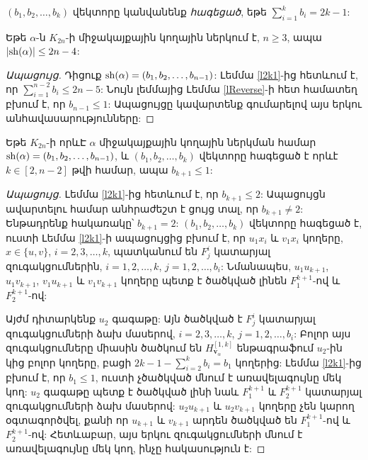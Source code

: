 $(b_1,b_2,\ldots,b_k)$ վեկտորը կանվանենք \textit{հագեցած}, եթե $\sum\limits_{i=1}^{k}{b_i} = 2k-1$:

\begin{corollary}
\label{c2n4}
Եթե $\alpha$-ն $K_{2n}$-ի միջակայքային կողային ներկում է, $n\geq 3$, ապա  
$|{\rm sh}(\alpha)| \leq 2n-4$:
\end{corollary}

\begin{proof}[Ապացույց]
Դիցուք ${\rm sh}(\alpha) = (b_1,b_2,\ldots, b_{n-1})$: Լեմմա \ref{l2k1}-ից հետևում է, որ $\sum\limits_{i=1}^{n-2}{b_i} \leq 2n-5$: Նույն լեմմայից Լեմմա \ref{lReverse}-ի հետ համատեղ բխում է, որ $b_{n-1} \leq 1$: Ապացույցը կավարտենք գումարելով այս երկու անհավասարությունները:
\end{proof}

\begin{lemma}
\label{lAfterSaturated}
Եթե $K_{2n}$-ի որևԷ $\alpha$ միջակայքային կողային ներկման համար ${\rm sh}(\alpha) = (b_1,b_2,\ldots, b_{n-1})$, և $(b_1,b_2,\ldots,b_k)$ վեկտորը հագեցած է որևէ $k \in [2,n-2]$ թվի համար, ապա $b_{k+1} \leq 1$:
\end{lemma}

\begin{proof}[Ապացույց]
Լեմմա \ref{l2k1}-ից հետևում է, որ $b_{k+1} \leq 2$: Ապացույցն ավարտելու համար անհրաժեշտ է ցույց տալ, որ $b_{k+1} \neq 2$: Ենթադրենք հակառակը՝ $b_{k+1} = 2$: $(b_1,b_2,\ldots,b_k)$ վեկտորը հագեցած է, ուստի Լեմմա \ref{l2k1}-ի ապացույցից բխում է, որ $u_1x_i$ և $v_1x_i$ կողերը, $x \in \{u,v\}$, $i=2,3,\ldots,k$, պատկանում են $F^i_j$ կատարյալ զուգակցումներին, $i=1,2,\ldots,k$, $j=1,2,\ldots,b_i$: Նմանապես, $u_1u_{k+1}$, $u_1v_{k+1}$, $v_1u_{k+1}$ և $v_1v_{k+1}$ կողերը պետք է ծածկված լինեն $F^{k+1}_1$-ով և $F^{k+1}_2$-ով:

Այժմ դիտարկենք $u_2$ գագաթը: Այն ծածկված է $F^i_j$ կատարյալ զուգակցումների ձախ մասերով, $i=2,3,\ldots,k$, $j=1,2,\ldots,b_i$: Բոլոր այս զուգակցումները միասին ծածկում են $H_{\mathbf{v}_\alpha}^{[1,k]}$ ենթագրաֆում $u_2$-ին կից բոլոր կողերը, բացի $2k-1 - \sum\limits_{i=2}^{k}{b_i} = b_1$ կողերից: Լեմմա \ref{l2k1}-ից բխում է, որ $b_1 \leq 1$, ուստի չծածկված մնում է առավելագույնը մեկ կող: $u_2$ գագաթը պետք է ծածկված լինի նաև $F^{k+1}_1$ և $F^{k+1}_2$ կատարյալ զուգակցումների ձախ մասերով: $u_2u_{k+1}$ և $u_2v_{k+1}$ կողերը չեն կարող օգտագործվել, քանի որ $u_{k+1}$ և $v_{k+1}$ արդեն ծածկված են $F^{k+1}_1$-ով և $F^{k+1}_2$-ով: Հետևաբար, այս երկու զուգակցումների մնում է առավելագույնը մեկ կող, ինչը հակասություն է:
\end{proof}


